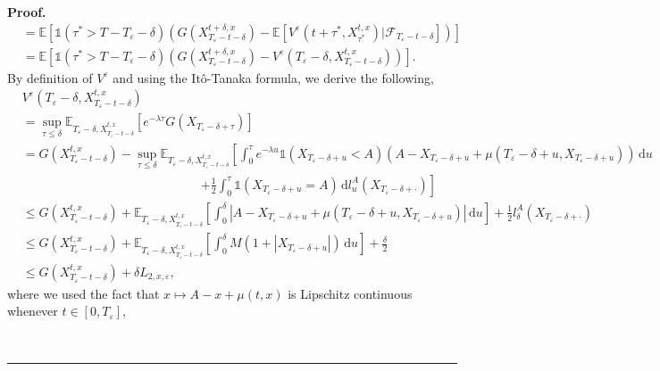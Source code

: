 \documentclass{tufte-handout}
\newcommand{\E}{\mathbb{E}} %
\newcommand{\dif}{\mathrm{d}}
\newenvironment{pf}[1][Proof]{\textbf{#1.} }{\ \rule{0.5em}{0.5em}}
\begin{document}
\begin{pf}
\begin{align}
		&= \E\left[\mathbb{1}(\tau^* > T - T_\varepsilon - \delta)\left(G(X_{T_\varepsilon - t - \delta}^{t + \delta, x}) - \E\left[V^{\varepsilon}(t + \tau^*, X_{\tau^*}^{t, x}) | \mathcal{F}_{T_\varepsilon - t - \delta}\right]\right)\right] \nonumber \\
		&= \E\left[\mathbb{1}(\tau^* > T - T_\varepsilon - \delta)\left(G(X_{T_\varepsilon - t - \delta}^{t + \delta, x}) - V^{\varepsilon}(T_\varepsilon - \delta, X_{T_\varepsilon - t - \delta}^{t, x})\right)\right]. \label{eq:V^eps_Lcont_1}
		\end{align}
		By definition of $V^\varepsilon$ and using the Itô-Tanaka formula, we derive the following,
		\begin{align}
		&V^{\varepsilon}(T_\varepsilon - \delta, X_{T_\varepsilon - t - \delta}^{t, x}) \nonumber \\
		&= \sup_{\tau \leq \delta}\E_{T_\varepsilon - \delta, X_{T_\varepsilon - t - \delta}^{t, x}}\left[e^{-\lambda\tau}G(X_{T_\varepsilon - \delta + \tau})\right] \nonumber \\
		&= G(X_{T_\varepsilon - t - \delta}^{t, x}) - \sup_{\tau \leq \delta}\E_{T_\varepsilon - \delta, X_{T_\varepsilon - t - \delta}^{t, x}}\left[\int_{0}^{\tau}e^{-\lambda u}\mathbb{1}\left(X_{T_\varepsilon - \delta + u} < A\right)\left(A - X_{T_\varepsilon - \delta + u} + \mu(T_\varepsilon - \delta + u, X_{T_\varepsilon - \delta + u})\right)\,\dif u\right. \nonumber \\
		&\hspace{6cm} \left. + \frac{1}{2}\int_{0}^{\tau}\mathbb{1}(X_{T_\varepsilon - \delta + u} = A)\,\dif l_u^A(X_{T_\varepsilon - \delta + \cdot}) \right] \nonumber \\
		&\leq G(X_{T_\varepsilon - t - \delta}^{t, x}) + \E_{T_\varepsilon - \delta, X_{T_\varepsilon - t - \delta}^{t, x}}\left[\int_{0}^{\delta}\left|A - X_{T_\varepsilon - \delta + u} + \mu(T_\varepsilon - \delta + u, X_{T_\varepsilon - \delta + u})\right|\,\dif u\right] + \frac{1}{2}l_\delta^A(X_{T_\varepsilon - \delta + \cdot}) \nonumber \\
		&\leq G(X_{T_\varepsilon - t - \delta}^{t, x}) + \E_{T_\varepsilon - \delta, X_{T_\varepsilon - t - \delta}^{t, x}}\left[\int_{0}^{\delta}M\left(1 + \left|X_{T_\varepsilon - \delta + u}\right|\right)\,\dif u\right] + \frac{\delta}{2} \nonumber \\
		&\leq G(X_{T_\varepsilon - t - \delta}^{t, x}) + \delta L_{2, x, \varepsilon}, \label{eq:V^eps_Lcont_2}
		\end{align}
		where we used the fact that $x \mapsto A - x + \mu(t, x)$ is Lipschitz continuous whenever $t\in[0, T_\varepsilon]$,

\end{pf}
\end{document}
